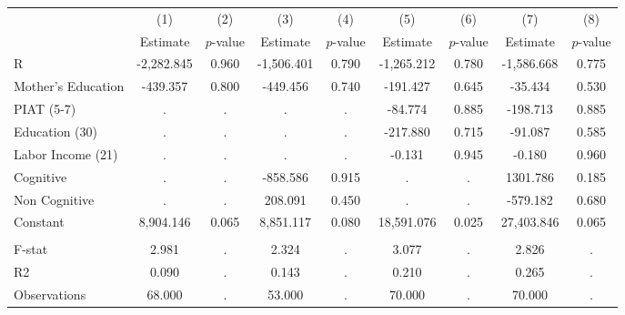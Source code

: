 \begin{tabular}{lcccccccc} \toprule
 & (1) & (2) & (3) & (4) & (5) & (6) & (7) & (8) \\ 
 & Estimate  & $p$-value  & Estimate  & $p$-value  & Estimate  & $p$-value  & Estimate  & $p$-value  \\  \midrule
R & -2,282.845 &     0.960 & -1,506.401 &     0.790 & -1,265.212 &     0.780 & -1,586.668 &     0.775 \\  
Mother's Education &  -439.357 &     0.800 &  -449.456 &     0.740 &  -191.427 &     0.645 &   -35.434 &     0.530 \\  
PIAT (5-7) &         . &         . &         . &         . &   -84.774 &     0.885 &  -198.713 &     0.885 \\  
Education (30) &         . &         . &         . &         . &  -217.880 &     0.715 &   -91.087 &     0.585 \\  
Labor Income (21) &         . &         . &         . &         . &    -0.131 &     0.945 &    -0.180 &     0.960 \\  
Cognitive &         . &         . &  -858.586 &     0.915 &         . &         . &  1301.786 &     0.185 \\  
Non Cognitive &         . &         . &   208.091 &     0.450 &         . &         . &  -579.182 &     0.680 \\  
Constant &  8,904.146 &     0.065 &  8,851.117 &     0.080 & 18,591.076 &     0.025 & 27,403.846 &     0.065 \\ \\  \midrule
F-stat &     2.981 &         . &     2.324 &         . &     3.077 &         . &     2.826 &         . \\  
R2 &     0.090 &         . &     0.143 &         . &     0.210 &         . &     0.265 &         . \\  
Observations &    68.000 &         . &    53.000 &         . &    70.000 &         . &    70.000 &         . \\  
\bottomrule \end{tabular}
